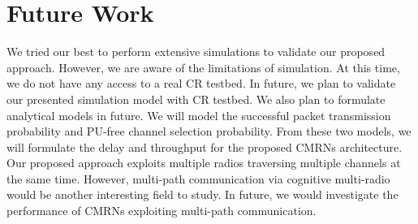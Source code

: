 \chapter{Future Work}
We tried our best to perform extensive simulations to validate our proposed approach. However, we are aware of the limitations of simulation. At this time, we do not have any access to a real CR testbed. In future, we plan to validate our presented simulation model with CR testbed. We also plan to formulate analytical models in future. We will model the successful packet transmission probability and PU-free channel selection probability. From these two models, we will formulate the delay and throughput for the proposed CMRNs architecture. Our proposed approach exploits multiple radios traversing multiple channels at the same time. However, multi-path communication via cognitive multi-radio would be another interesting field to study. In future, we would investigate the performance of CMRNs exploiting multi-path communication.
\endinput
